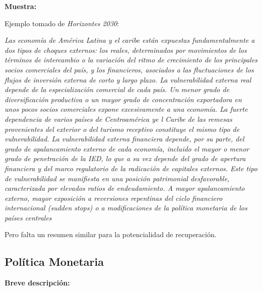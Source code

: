 \documentclass[12pt,a4paper]{article}
\begin{document}
\textbf{Muestra:} \newline

Ejemplo tomado de \textit{Horizontes 2030}:

\textit{Las economía de América Latina y el caribe están expuestas fundamentalmente a dos tipos de choques externos: los reales, determinados por movimientos de los términos de intercambio o la variación del ritmo de crecimiento de los principales socios comerciales del país, y los financieros, asociados a las fluctuaciones de los flujos de inversión externa de corto y largo plazo. \newline \newline
La vulnerabilidad externa real depende de la especialización comercial de cada país. Un menor grado de diversificación productiva o un mayor grado de concentración exportadora en unos pocos socios comerciales expone excesivamente a una economía. La fuerte dependencia de varios países de Centroamérica ye l Caribe de las remesas provenientes del exterior o del turismo receptivo constituye el mismo tipo de vulnerabilidad. La vulnerabilidad externa financiera depende, por su parte, del grado de apalancamiento externo de cada economía, incluido el mayor o menor grado de penetración de la IED, lo que a su vez depende del grado de apertura financiera y del marco regulatorio de la radicación de capitales externos. Este tipo de vulnerabilidad se manifiesta en una posición patrimonial desfavorable, caracterizada por elevados ratios de endeudamiento. A mayor apalancamiento externo, mayor exposición a reversiones repentinas del ciclo financiero internacional (sudden stops) o a modificaciones de la política monetaria de los países centrales}


Pero falta un resumen similar para la potencialidad de recuperación.

\vspace{0.5cm}
\subsection{Política Monetaria}
\textbf{Breve descripción:} \newline
\end{document}
